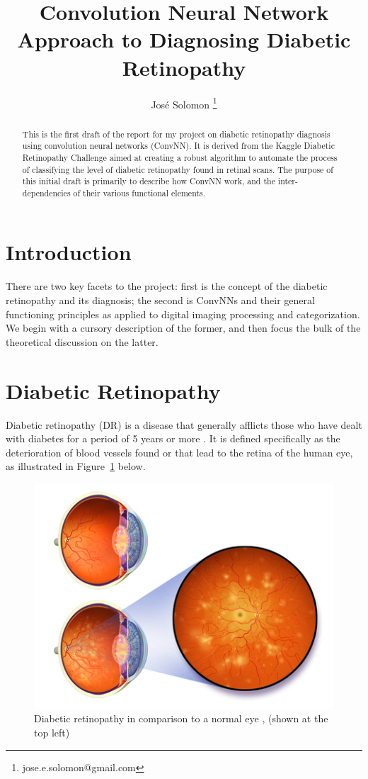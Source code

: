 \documentclass[letterpaper,12pt]{article}
\title{Convolution Neural Network Approach to Diagnosing Diabetic Retinopathy}
\author{Jos\'e Solomon \thanks{jose.e.solomon@gmail.com} }
\date{}
\newcommand{\figref}[1]{Figure~\ref{#1}}
\begin{document}
\maketitle
\begin{abstract}
This is the first draft of the report for my project on diabetic retinopathy diagnosis using convolution neural networks (ConvNN). It is derived from the Kaggle Diabetic Retinopathy Challenge \cite{kaggle} aimed at creating a robust algorithm to automate the process of classifying the level of diabetic retinopathy found in retinal scans. The purpose of this initial draft is primarily to describe how ConvNN work, and the inter-dependencies  of their various functional elements. 
\end{abstract}
\tableofcontents

\section{Introduction}

There are two key facets to the project: first is the concept of the diabetic retinopathy and its diagnosis; the second is ConvNNs and their general functioning principles as applied to digital imaging processing and categorization. We begin with a cursory description of the former, and then focus the bulk of the theoretical discussion on the latter.

\section{Diabetic Retinopathy}

Diabetic retinopathy (DR) is a disease that generally afflicts those who have dealt with diabetes for a period of 5 years or more \cite{nih}. It is defined specifically as the deterioration of blood vessels found or that lead to the retina of the human eye, as illustrated in \figref{eye} below.

\begin{figure}[htbp]
\begin{center}
\includegraphics[scale=0.6]{images/illustration.png}
\caption{Diabetic retinopathy in comparison to a normal eye \cite{wiki}, (shown at the top left)}
\label{eye}
\end{center}
\end{figure}
\end{document}

